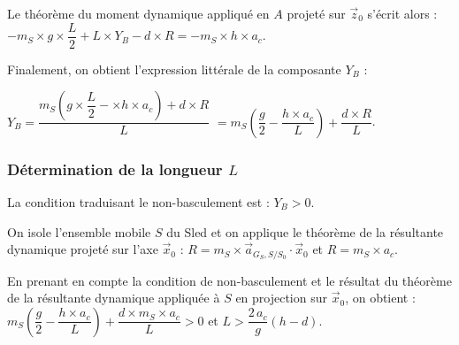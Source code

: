 \begin{corrige}
Le théorème du moment dynamique appliqué en $A$ projeté sur $\vec z_0$ s'écrit alors :
$ - m_S \times g \times \dfrac{L}{2} + L \times Y_B - d \times R = - m_S \times h \times a_c $.

Finalement, on obtient l'expression littérale de la composante $Y_B$ :

$ Y_B = \dfrac{m_S \left(g \times \dfrac{L}{2} -\times h \times a_c\right) + d \times R}{L}$
$  = m_S \left( \dfrac{g}{2} - \dfrac{h \times a_c}{L}\right) + \dfrac{d \times R}{L}$.
\end{corrige}
\else
\fi


\subsubsection*{Détermination de la longueur $L$ \label{ccs_mp_2022_sec_2B2}}

\ifprof
\begin{corrige}
La condition traduisant le non-basculement est : $ Y_B > 0$.
\end{corrige}
\else
\fi


\ifprof
\begin{corrige}
On isole l'ensemble mobile $S$ du Sled et on applique le théorème de la résultante dynamique projeté sur l'axe $\vec x_0$ :
$ R = m_S \times \overrightarrow{a}_{G_S, S/S_0} \cdot \vec x_0$ et
$ R = m_S \times a_c$.
\end{corrige}
\else
\fi


\ifprof
\begin{corrige}
En prenant en compte la condition de non-basculement et le résultat du théorème de la résultante dynamique appliquée à $S$ en projection sur $\vec x_0$, on obtient :
$  m_S \left( \dfrac{g}{2} - \dfrac{h \times a_c}{L}\right) + \dfrac{d \times m_S \times a_c}{L} > 0$
et $  L > \dfrac{2\,a_c}{g} (h - d)$.

\end{corrige}
\else
\fi


